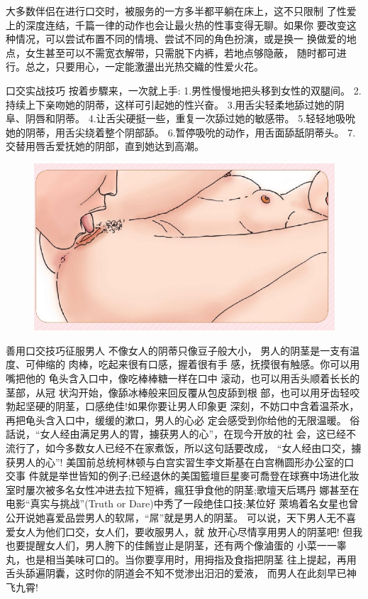 \documentclass[12pt,UTF8]{ctexbook}
\begin{document}
大多数伴侣在进行口交时，被服务的一方多半都平躺在床上，这不只限制
了性爱上的深度连结，千篇一律的动作也会让最火热的性事变得无聊。如果你
要改变这种情况，可以尝试布置不同的情境、尝试不同的角色扮演，或是换一
换做爱的地点，女生甚至可以不需宽衣解带，只需脱下内裤，若地点够隐蔽，
随时都可进行。总之，只要用心，一定能激盪出光热交織的性爱火花。

口交实战技巧
按着步驟来，一次就上手:
1.男性慢慢地把头移到女性的双腿间。
2.持续上下亲吻她的阴蒂，这样可引起她的性兴奋。
3.用舌尖轻柔地舔过她的阴阜、阴唇和阴蒂。
4.让舌尖硬挺一些，重复一次舔过她的敏感带。
5.轻轻地吸吮她的阴蒂，用舌尖绕着整个阴部舔。
6.暂停吸吮的动作，用舌面舔舐阴蒂头。
7.交替用唇舌爱抚她的阴部，直到她达到高潮。

\begin{figure}[htbp]
	\centering
	\includegraphics[width=0.7\linewidth]{19}
	\caption{}
	\label{fig:1}
\end{figure}

善用口交技巧征服男人
不像女人的阴蒂只像豆子般大小，
男人的阴茎是一支有温度、可伸缩的
肉棒，吃起来很有口感，握着很有手
感，抚摸很有触感。你可以用嘴把他的
龟头含入口中，像吃棒棒糖一样在口中
滚动，也可以用舌头顺着长长的茎部，从冠
状沟开始，像舔冰棒般来回反覆从包皮舔到根
部，也可以用牙齿轻咬勃起坚硬的阴茎，口感绝佳!如果你要让男人印象更
深刻，不妨口中含着温茶水，再把龟头含入口中，缓缓的漱口，男人的心必
定会感受到你给他的无限温暖。
俗話说，“女人经由满足男人的胃，擄获男人的心”，在现今开放的社
会，这已经不流行了，如今多数女人已经不在家煮饭，所以这句話要改成，
“女人经由口交，擄获男人的心”!
美国前总统柯林顿与白宫实習生李文斯基在白宫椭圆形办公室的口交事
件就是举世皆知的例子;已经退休的美国籃壇巨星麥可喬登在球赛中场进化妝室时屢次被多名女性冲进去拉下短裤，瘋狂爭食他的阴茎;歌壇天后瑪丹
娜甚至在电影“真实与挑战”(Truth or Dare)中秀了一段绝佳口技;某位好
萊塢着名女星也曾公开说她喜爱品尝男人的软屌，“屌”就是男人的阴茎。
可以说，天下男人无不喜爱女人为他们口交，女人们，要收服男人，就
放开心尽情享用男人的阴茎吧!
但我也要提醒女人们，男人胯下的佳餚豈止是阴茎，还有两个像滷蛋的
小菜一一睾丸，也是相当美味可口的。当你要享用时，用拇指及食指把阴茎
往上提起，再用舌头舔遍阴囊，这时你的阴道会不知不觉渗出汨汨的爱液，
而男人在此刻早已神飞九霄!
\end{document}
